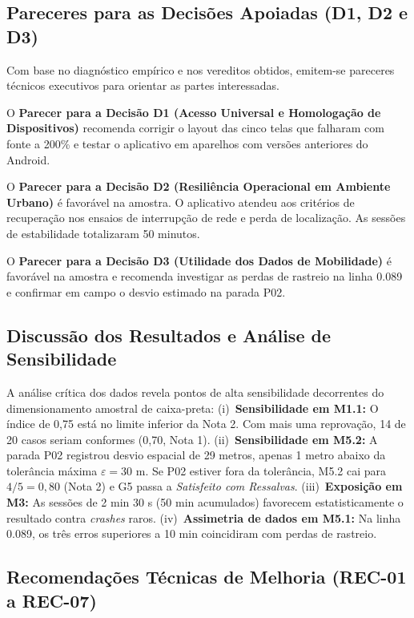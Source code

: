 \documentclass[11pt,a4paper]{article}
\begin{document}
\subsection{Pareceres para as Decisões Apoiadas (D1, D2 e D3)}
\label{sec:pareceres_decisoes}

Com base no diagnóstico empírico e nos vereditos obtidos, emitem-se pareceres técnicos executivos para orientar as partes interessadas.

O \textbf{Parecer para a Decisão D1 (Acesso Universal e Homologação de Dispositivos)} recomenda corrigir o layout das cinco telas que falharam com fonte a 200\% e testar o aplicativo em aparelhos com versões anteriores do Android.

O \textbf{Parecer para a Decisão D2 (Resiliência Operacional em Ambiente Urbano)} é favorável na amostra. O aplicativo atendeu aos critérios de recuperação nos ensaios de interrupção de rede e perda de localização. As sessões de estabilidade totalizaram 50 minutos.

O \textbf{Parecer para a Decisão D3 (Utilidade dos Dados de Mobilidade)} é favorável na amostra e recomenda investigar as perdas de rastreio na linha 0.089 e confirmar em campo o desvio estimado na parada P02.

\subsection{Discussão dos Resultados e Análise de Sensibilidade}
\label{sec:sensibilidade_ameacas}

A análise crítica dos dados revela pontos de alta sensibilidade decorrentes do dimensionamento amostral de caixa-preta: (i)~\textbf{Sensibilidade em M1.1:} O índice de 0,75 está no limite inferior da Nota 2. Com mais uma reprovação, 14 de 20 casos seriam conformes (0,70, Nota 1). (ii)~\textbf{Sensibilidade em M5.2:} A parada P02 registrou desvio espacial de 29 metros, apenas 1 metro abaixo da tolerância máxima $\varepsilon = 30$ m. Se P02 estiver fora da tolerância, M5.2 cai para $4/5 = 0{,}80$ (Nota 2) e G5 passa a \textit{Satisfeito com Ressalvas}. (iii)~\textbf{Exposição em M3:} As sessões de 2 min 30 s (50 min acumulados) favorecem estatisticamente o resultado contra \textit{crashes} raros. (iv)~\textbf{Assimetria de dados em M5.1:} Na linha 0.089, os três erros superiores a 10 min coincidiram com perdas de rastreio.

\subsection{Recomendações Técnicas de Melhoria (REC-01 a REC-07)}
\label{sec:recomendacoes}
\end{document}
